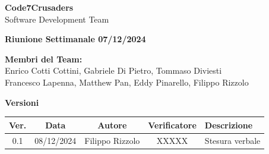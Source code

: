 \documentclass{article}
\begin{document}
\begin{titlepage}
    {\Huge \textbf{Code7Crusaders}}\\
    \vspace{0.5cm}
    {\Large Software Development Team}\\
    \vspace{2cm}
    
    {\large \textbf{Riunione Settimanale 07/12/2024}}\\ 
    \vspace{5cm}                           
    
    
    \textbf{Membri del Team:}\\
    Enrico Cotti Cottini, Gabriele Di Pietro, Tommaso Diviesti \\
    Francesco Lapenna, Matthew Pan, Eddy Pinarello, Filippo Rizzolo \\
    \vspace{0.5cm}
    
    \vspace{1cm}
\end{titlepage}



\newpage
\begin{table}[h!]
\centering
\textbf{Versioni} \\ %
\vspace{2mm} %
\begin{tabular}{|c|c|c|c|>{\raggedright\arraybackslash}p{}|}
    \hline
    \textbf{Ver.} & \textbf{Data} & \textbf{Autore} & \textbf{Verificatore} & \textbf{Descrizione} \\
    \hline
    0.1 & 08/12/2024 & Filippo Rizzolo & XXXXX & Stesura verbale \\ 
    \hline                                  
\end{tabular}
\end{table}



\newpage
\tableofcontents



\newpage
\end{document}
